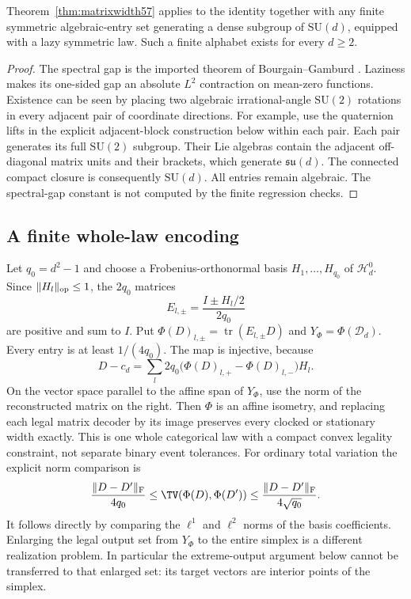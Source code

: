 \begin{corollary}\label{cor:algebraicunitary57}
Theorem~\ref{thm:matrixwidth57} applies to the identity together with any finite symmetric algebraic-entry set generating a dense subgroup of $\mathrm{SU}(d)$, equipped with a lazy symmetric law. Such a finite alphabet exists for every $d\ge2$.
\end{corollary}
\begin{proof}
The spectral gap is the imported theorem of Bourgain--Gamburd \cite{BG2012}. Laziness makes its one-sided gap an absolute $L^2$ contraction on mean-zero functions. Existence can be seen by placing two algebraic irrational-angle $\mathrm{SU}(2)$ rotations in every adjacent pair of coordinate directions. For example, use the quaternion lifts in the explicit adjacent-block construction below within each pair. Each pair generates its full $\mathrm{SU}(2)$ subgroup. Their Lie algebras contain the adjacent off-diagonal matrix units and their brackets, which generate $\mathfrak{su}(d)$. The connected compact closure is consequently $\mathrm{SU}(d)$. All entries remain algebraic. The spectral-gap constant is not computed by the finite regression checks.
\end{proof}

\subsection{A finite whole-law encoding}
Let $q_0=d^2-1$ and choose a Frobenius-orthonormal basis $H_1,\ldots,H_{q_0}$ of $\mathcal H_d^0$. Since $\|H_l\|_{\rm op}\le1$, the $2q_0$ matrices
\[
 E_{l,\pm}=\frac{I\pm H_l/2}{2q_0}
\]
are positive and sum to $I$. Put $\Phi(D)_{l,\pm}=\operatorname{tr}(E_{l,\pm}D)$ and $Y_\Phi=\Phi(\mathcal D_d)$. Every entry is at least $1/(4q_0)$. The map is injective, because
\begin{equation}\label{eq:tomography57}
 D-c_d=\sum_l2q_0\bigl(\Phi(D)_{l,+}-\Phi(D)_{l,-}\bigr)H_l.
\end{equation}
On the vector space parallel to the affine span of $Y_\Phi$, use the norm of the reconstructed matrix on the right. Then $\Phi$ is an affine isometry, and replacing each legal matrix decoder by its image preserves every clocked or stationary width exactly. This is one whole categorical law with a compact convex legality constraint, not separate binary event tolerances. For ordinary total variation the explicit norm comparison is
\[
 \frac{\|D-D'\|_{\rm F}}{4q_0}
 \le\TV(\Phi(D),\Phi(D'))
 \le\frac{\|D-D'\|_{\rm F}}{4\sqrt{q_0}}.
\]
It follows directly by comparing the $\ell^1$ and $\ell^2$ norms of the basis coefficients. Enlarging the legal output set from $Y_\Phi$ to the entire simplex is a different realization problem. In particular the extreme-output argument below cannot be transferred to that enlarged set: its target vectors are interior points of the simplex.

